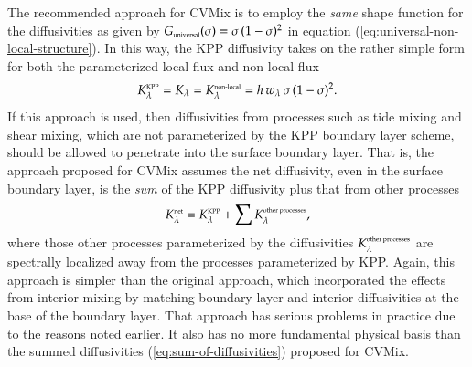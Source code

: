 The recommended approach for CVMix is to employ the {\it same} shape
function for the diffusivities as given by $G_{\mbox{\tiny
    universal}}(\sigma)= \sigma \, (1-\sigma)^{2}$ in equation
(\ref{eq:universal-non-local-structure}).  In this way, the KPP
diffusivity takes on the rather simple form for both the parameterized
local flux and non-local flux
\begin{equation}
 K^{\mbox{\tiny KPP}}_{\lambda}  = K_{\lambda}  =  K^{\mbox{\tiny non-local}}_{\lambda} = h \, w_{\lambda} \, \sigma \, (1-\sigma)^{2}.
\label{eq:universal-diffusivity}
\end{equation}
If this approach is used, then diffusivities from processes such as
tide mixing and shear mixing, which are not parameterized by the KPP
boundary layer scheme, should be allowed to penetrate into the surface
boundary layer.  That is, the approach proposed for CVMix assumes the
net diffusivity, even in the surface boundary layer, is the {\it sum}
of the KPP diffusivity plus that from other processes
\begin{equation}
 K_{\lambda}^{\mbox{\tiny net}} =  K^{\mbox{\tiny KPP}}_{\lambda} + \sum  K^{\mbox{\tiny other processes}}_{\lambda},
\label{eq:sum-of-diffusivities}
\end{equation}
where those other processes parameterized by the diffusivities
$K^{\mbox{\tiny other processes}}_{\lambda}$ are spectrally localized
away from the processes parameterized by KPP.  Again, this approach is
simpler than the original \cite{LargeKPP} approach, which incorporated
the effects from interior mixing by matching boundary layer and
interior diffusivities at the base of the boundary layer.  That
approach has serious problems in practice due to the reasons noted
earlier.  It also has no more fundamental physical basis than the
summed diffusivities (\ref{eq:sum-of-diffusivities}) proposed for
CVMix.

